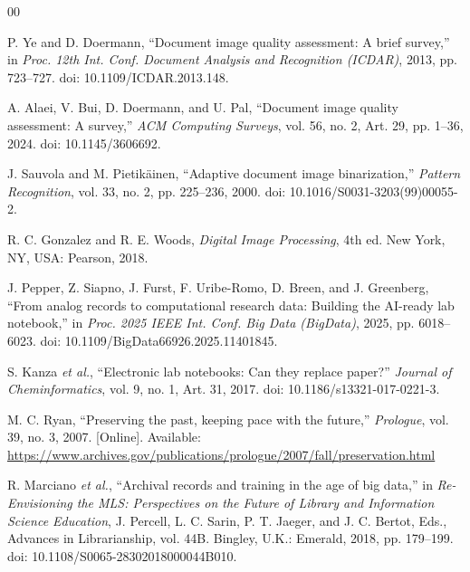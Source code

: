 %   
%   

\begin{thebibliography}{00}

P. Ye and D. Doermann, ``Document image quality assessment: A brief survey,'' in \emph{Proc. 12th Int. Conf. Document Analysis and Recognition (ICDAR)}, 2013, pp. 723--727. doi: 10.1109/ICDAR.2013.148.

A. Alaei, V. Bui, D. Doermann, and U. Pal, ``Document image quality assessment: A survey,'' \emph{ACM Computing Surveys}, vol. 56, no. 2, Art. 29, pp. 1--36, 2024. doi: 10.1145/3606692.

J. Sauvola and M. Pietik{\"a}inen, ``Adaptive document image binarization,'' \emph{Pattern Recognition}, vol. 33, no. 2, pp. 225--236, 2000. doi: 10.1016/S0031-3203(99)00055-2.

R. C. Gonzalez and R. E. Woods, \emph{Digital Image Processing}, 4th ed. New York, NY, USA: Pearson, 2018.

J. Pepper, Z. Siapno, J. Furst, F. Uribe-Romo, D. Breen, and J. Greenberg, ``From analog records to computational research data: Building the AI-ready lab notebook,'' in \emph{Proc. 2025 IEEE Int. Conf. Big Data (BigData)}, 2025, pp. 6018--6023. doi: 10.1109/BigData66926.2025.11401845.

S. Kanza \emph{et al.}, ``Electronic lab notebooks: Can they replace paper?'' \emph{Journal of Cheminformatics}, vol. 9, no. 1, Art. 31, 2017. doi: 10.1186/s13321-017-0221-3.

M. C. Ryan, ``Preserving the past, keeping pace with the future,'' \emph{Prologue}, vol. 39, no. 3, 2007. [Online]. Available: \url{https://www.archives.gov/publications/prologue/2007/fall/preservation.html}

R. Marciano \emph{et al.}, ``Archival records and training in the age of big data,'' in \emph{Re-Envisioning the MLS: Perspectives on the Future of Library and Information Science Education}, J. Percell, L. C. Sarin, P. T. Jaeger, and J. C. Bertot, Eds., Advances in Librarianship, vol. 44B. Bingley, U.K.: Emerald, 2018, pp. 179--199. doi: 10.1108/S0065-28302018000044B010.


\end{thebibliography}

